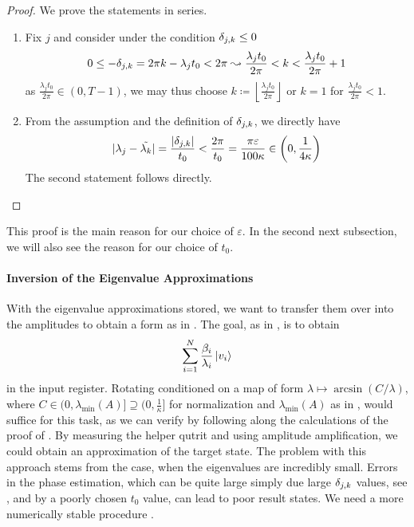 \begin{proof} We prove the statements in series.

    \begin{enumerate}[label=(\roman*)]
        \item \label{existence_of_eigenvalue_approximations_1} Fix \(j\) and consider under the condition \(\delta_{j, k} \leq 0\)
        \begin{align}
            0 \leq -\delta_{j, k} = 2 \pi k - \lambda_jt_0 < 2\pi \leadsto \frac{\lambda_jt_0}{2\pi} < k < \frac{\lambda_jt_0}{2\pi}+1
        \end{align}
        as \(\frac{\lambda_jt_0}{2\pi} \in (0, T-1)\), we may thus choose \(k \coloneqq \left\lfloor \frac{\lambda_jt_0}{2\pi} \right\rfloor\) or \(k = 1\) for \(\frac{\lambda_jt_0}{2\pi} < 1\).
        \item \label{existence_of_eigenvalue_approximations_2}
        From the assumption and the definition of \(\delta_{j, k}\), we directly have
        \begin{align}
            |\lambda_j - \tilde{\lambda_k}| = \frac{|\delta_{j, k}|}{t_0} < \frac{2\pi}{t_0} = \frac{\pi\varepsilon}{100\kappa} \in \left(0, \frac{1}{4\kappa}\right)
        \end{align}
        The second statement follows directly.
    \end{enumerate}
     
\end{proof}

This proof is the main reason for our choice of \(\varepsilon\). In the second next subsection, we will also see the reason for our choice of \(t_0\).

\paragraph*{Inversion of the Eigenvalue Approximations} \label{hhl_inversion_of_approx} \phantom{} \vspace{\baselineskip}

With the eigenvalue approximations stored, we want to transfer them over into the amplitudes to obtain a form as in . The goal, as in , is to obtain
\begin{align}
    \sum_{i=1}^N \frac{\beta_i}{\lambda_i} \ket{v_i}
\end{align}
in the input register. Rotating conditioned on a map of form \(\lambda \mapsto \arcsin\left(C/\lambda\right)\), where \(C \in (0, \lambda_{\min{}}(A)] \supseteq (0, \frac{1}{\kappa}]\) for normalization and \(\lambda_{\min{}}(A)\) as in , would suffice for this task, as we can verify by following along the calculations of the proof of . By measuring the helper qutrit and using amplitude amplification, we could obtain an approximation of the target state. The problem with this approach stems from the case, when the eigenvalues are incredibly small. Errors in the phase estimation, which can be quite large simply due large \(\delta_{j, k}\) values, see , and by a poorly chosen \(t_0\) value, can lead to poor result states. We need a more numerically stable procedure \cite[p. 33]{Dervovic2018}.

